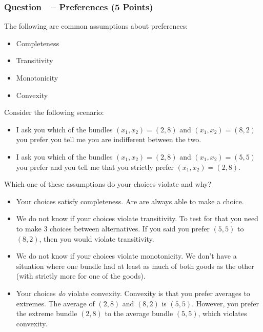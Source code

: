 \documentclass[12pt]{article}
\newcounter{question}[section]
\newcommand{\question}[1]{\refstepcounter{question}
  \subsubsection*{Question~\thequestion~-- #1}}
\begin{document}
\question{Preferences (5 Points)}
The following are common assumptions about preferences:
\begin{itemize}
  \item Completeness
  \item Transitivity
  \item Monotonicity
  \item Convexity
\end{itemize}
Consider the following scenario:
\begin{itemize}
  \item I ask you which of the bundles $\left( x_1,x_2 \right)=\left( 2,8
    \right)$ and $\left(x_1,x_2  \right)=\left( 8, 2 \right)$ you prefer you
    tell me you are indifferent between the two.
  \item I ask you which of the bundles $\left( x_1,x_2 \right)=\left( 2,8
    \right)$ and $\left( x_1,x_2 \right)=\left( 5,5 \right)$ you prefer and you
    tell me that you strictly prefer $\left( x_1,x_2 \right)=\left( 2,8
    \right)$.
\end{itemize}
Which one of these assumptions do your choices violate and why?
\textcolor{solution-color}{
  \begin{itemize}
    \item Your choices satisfy completeness. Are are always able to make a
      choice.
    \item We do not know if your choices violate transitivity. To test for that
      you need to make 3 choices between alternatives. If you said you prefer
      $\left( 5,5 \right)$ to $\left( 8,2 \right)$, then you would violate
      transitivity.
    \item We do not know if your choices violate monotonicity. We don't have a
      situation where one bundle had at least as much of both goods as the
      other (with strictly more for one of the goods).
    \item Your choices \emph{do} violate convexity. Convexity is that you prefer
      averages to extremes. The average of $\left( 2,8 \right)$ and $\left(
      8,2 \right)$ is $\left( 5,5 \right)$. However, you prefer the extreme
      bundle $\left( 2,8 \right)$ to the average bundle $\left( 5,5 \right)$,
      which violates convexity.
  \end{itemize}
}
\end{document}
